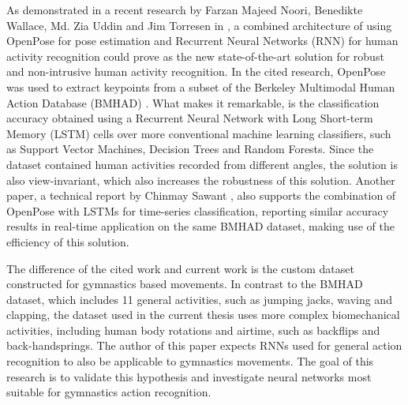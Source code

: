 As demonstrated in a recent research by Farzan Majeed Noori,
Benedikte Wallace, Md. Zia Uddin and Jim Torresen in \cite{10.1007/978-3-030-20205-7_25}, a combined architecture of using OpenPose for pose estimation and Recurrent Neural Networks (RNN) for human activity recognition could prove as the new state-of-the-art solution for robust and non-intrusive human activity recognition. In the cited research, OpenPose was used to extract keypoints from a subset of the Berkeley Multimodal Human Action Database (BMHAD) \cite{Berkeley-MHAD}. What makes it remarkable, is the classification accuracy obtained using a Recurrent Neural Network with Long Short-term Memory (LSTM) cells over more conventional machine learning classifiers, such as Support Vector Machines, Decision Trees and Random Forests. Since the dataset contained human activities recorded from different angles, the solution is also view-invariant, which also increases the robustness of this solution. Another paper, a technical report by Chinmay Sawant \cite{sawant2020human}, also supports the combination of OpenPose with LSTMs for time-series classification, reporting similar accuracy results in real-time application on the same BMHAD dataset, making use of the efficiency of this solution.

The difference of the cited work and current work is the custom dataset constructed for gymnastics based movements. In contrast to the BMHAD dataset, which includes 11 general activities, such as jumping jacks, waving and clapping, the dataset used in the current thesis uses more complex biomechanical activities, including human body rotations and airtime, such as backflips and back-handsprings. The author of this paper expects RNNs used for general action recognition to also be applicable to gymnastics movements. The goal of this research is to validate this hypothesis and investigate neural networks most suitable for gymnastics action recognition. 

